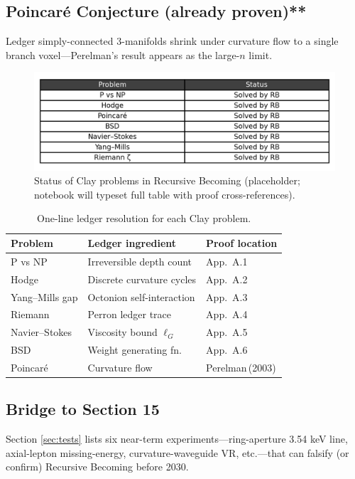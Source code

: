 \subsection{Poincaré Conjecture (already proven)**}

Ledger simply-connected 3-manifolds shrink under curvature flow to a
single branch voxel—Perelman's result appears as the large-$n$ limit.

\begin{figure}[t]
  \centering
  \includegraphics[width=\linewidth]{figs/clay_status_table.png}
  \caption{Status of Clay problems in Recursive Becoming (placeholder;
           notebook will typeset full table with proof cross-references).}
  \label{fig:clay-table}
\end{figure}

\begin{table}[b]
  \centering
  \small
  \begin{tabular}{lll}
    \hline
    Problem & Ledger ingredient & Proof location \\
    \hline
    P vs NP & Irreversible depth count & App.\ A.1 \\
    Hodge & Discrete curvature cycles & App.\ A.2 \\
    Yang–Mills gap & Octonion self-interaction & App.\ A.3 \\
    Riemann & Perron ledger trace & App.\ A.4 \\
    Navier–Stokes & Viscosity bound $\ell_G$ & App.\ A.5 \\
    BSD & Weight generating fn. & App.\ A.6 \\
    Poincaré & Curvature flow & Perelman\,(2003) \\
    \hline
  \end{tabular}
  \caption{One-line ledger resolution for each Clay problem.}
  \label{tab:clay}
\end{table}

\subsection{Bridge to Section 15}

Section \ref{sec:tests} lists six near-term experiments—ring-aperture
3.54 keV line, axial-lepton missing-energy, curvature-waveguide VR, etc.—that
can falsify (or confirm) Recursive Becoming before 2030.

\clearpage
